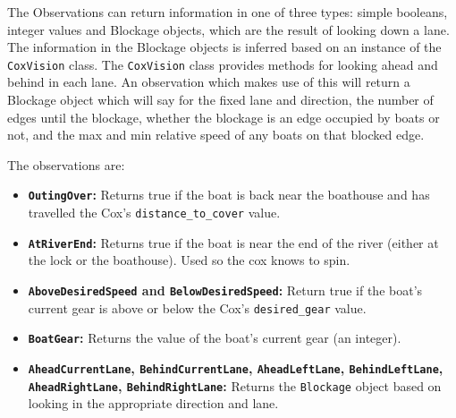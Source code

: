 The Observations can return information in one of three types: simple booleans, integer values and Blockage objects, which are the result of looking down a lane. The information in the Blockage objects is inferred based on an instance of the \texttt{CoxVision} class. The \texttt{CoxVision} class provides methods for looking ahead and behind in each lane. An observation which makes use of this will return a Blockage object which will say for the fixed lane and direction, the number of edges until the blockage, whether the blockage is an edge occupied by boats or not, and the max and min relative speed of any boats on that blocked edge.

The observations are:
  \begin{itemize}
    \item{\textbf{\texttt{OutingOver}:}} Returns true if the boat is back near the boathouse and has travelled the Cox's \texttt{distance\_to\_cover} value.
    \item{\textbf{\texttt{AtRiverEnd}:}} Returns true if the boat is near the end of the river (either at the lock or the boathouse). Used so the cox knows to spin.
    \item{\textbf{\texttt{AboveDesiredSpeed} and \texttt{BelowDesiredSpeed}:}} Return true if the boat's current gear is above or below the Cox's \texttt{desired\_gear} value. 
    \item{\textbf{\texttt{BoatGear}:}} Returns the value of the boat's current gear (an integer).
    \item{\textbf{\texttt{AheadCurrentLane}, \texttt{BehindCurrentLane}, \texttt{AheadLeftLane}, \texttt{BehindLeftLane}, \texttt{AheadRightLane}, \texttt{BehindRightLane}:}} Returns the \texttt{Blockage} object based on looking in the appropriate direction and lane.
  \end{itemize}
  
